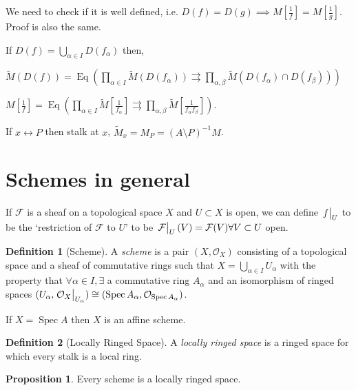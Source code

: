 \documentclass{article}
\theoremstyle{definition}
\newtheorem*{definition}{Definition}
\newtheorem{proposition}[theorem]{Proposition}
\begin{document}
    We need to check if it is well defined, i.e. \(D(f)=D(g) \implies M \left[ \frac{1}{f} \right] = M \left[ \frac{1}{g} \right]\). Proof is also the same.

    If \(D(f) = \bigcup_{\alpha \in I} D(f_\alpha)\) then,
    
    \(\widetilde{M} (D(f)) = \operatorname{Eq} \left( \prod_{\alpha \in I} \widetilde{M} (D(f_\alpha)) \rightrightarrows \prod_{\alpha , \beta} \widetilde{M} (D(f_\alpha)\cap D(f_\beta)) \right) \) 

    \(M \left[ \frac{1}{f} \right] = \operatorname{Eq} \left( \prod_{\alpha \in I} \widetilde{M} \left[ \frac{1}{f_\alpha} \right] \rightrightarrows \prod_{\alpha , \beta} \widetilde{M} \left[ \frac{1}{f_\alpha f_\beta} \right] \right)\).

    If \(x \leftrightarrow P\) then stalk at \(x\), \(\widetilde{M}_x = M_P = (A \setminus P)^{-1} M\).

    \section*{Schemes in general}

    If \(\mathcal{F}\) is a sheaf on a topological space \(X\) and \(U \subset X\) is open, we can define \(\eval{f}_{U}\) to be the `restriction of \(\mathcal{F}\) to \(U\)' to be \(\eval{\mathcal{F}}_U(V) = \mathcal{F}(V) \forall V \subset U\) open.

    \begin{definition}
        [Scheme] A \textit{scheme} is a pair \((X, \mathcal{O}_X)\) consisting of a topological space and a sheaf of commutative rings such that \(X = \bigcup_{\alpha \in I} U_\alpha\) with the property that \(\forall \alpha \in I, \exists\) a commutative ring \(A_\alpha\) and an isomorphism of ringed spaces \((U_\alpha , \eval{\mathcal{O}_X}_{U_\alpha}) \cong (\operatorname{Spec} A_\alpha, \mathcal{O}_{\operatorname{Spec} A_\alpha})\).

        If \(X = \operatorname{Spec} A\) then \(X\) is an affine scheme.
    \end{definition}

    \begin{definition}
        [Locally Ringed Space]

        A \textit{locally ringed space} is a ringed space for which every stalk is a local ring.
    \end{definition}

    \begin{proposition}
        Every scheme is a locally ringed space.
    \end{proposition}
\end{document}
